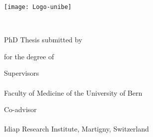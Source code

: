 
\begin{titlepage}
	
	\hfill{\texttt{[image: Logo-unibe]}}
	
	\begin{center}
		
		\vspace*{0.5cm}
		{\Large \facname \\ \textsc{\univname} \par}\vspace{1cm} %
		
		{\huge \bfseries \ttitle\par}\vspace{1cm} %
		
		
		\large{PhD Thesis submitted by}\vspace{0.5cm}
		
		{\Large \bfseries \authorname \par}\vspace{0.5cm}
		
		
  
        \vspace{0.5cm}
		
		\large{for } the degree of \degreename \vspace{0.5cm}
		
		\vfill
		
		\large{Supervisors \\ \supname \\ Faculty of Medicine of the University of Bern}\vspace{0.5cm}
		
		\large{Co-advisor \\ \examname \\ Idiap Research Institute, Martigny, Switzerland}\vspace{0.5cm}
		
	\end{center}
\end{titlepage}
\cleardoublepage

